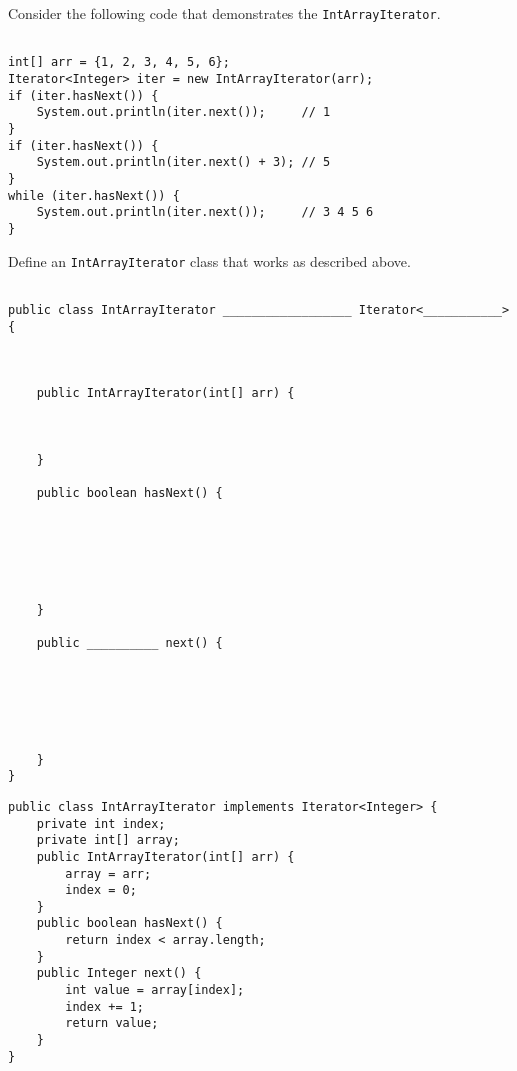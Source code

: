 \question Consider the following code that demonstrates the \lstinline$IntArrayIterator$.
\begin{lstlisting}

int[] arr = {1, 2, 3, 4, 5, 6};
Iterator<Integer> iter = new IntArrayIterator(arr);
if (iter.hasNext()) {
    System.out.println(iter.next());     // 1
}
if (iter.hasNext()) {
    System.out.println(iter.next() + 3); // 5
}
while (iter.hasNext()) {
    System.out.println(iter.next());     // 3 4 5 6
}

\end{lstlisting}
\clearpage
Define an \lstinline$IntArrayIterator$ class that works as described above.
\ifprintanswers\else
\begin{lstlisting}

public class IntArrayIterator __________________ Iterator<___________> {



    public IntArrayIterator(int[] arr) {



    }
    
    public boolean hasNext() {






    }
    
    public __________ next() {
    
    
    
    
    
    
    }
}
\end{lstlisting}
\fi
\begin{solution}%
\begin{lstlisting}
public class IntArrayIterator implements Iterator<Integer> {
    private int index;
    private int[] array;
    public IntArrayIterator(int[] arr) {
        array = arr;
        index = 0;
    }
    public boolean hasNext() {
        return index < array.length;
    }
    public Integer next() {
        int value = array[index];
        index += 1;
        return value;
    }
}
\end{lstlisting}
\end{solution}